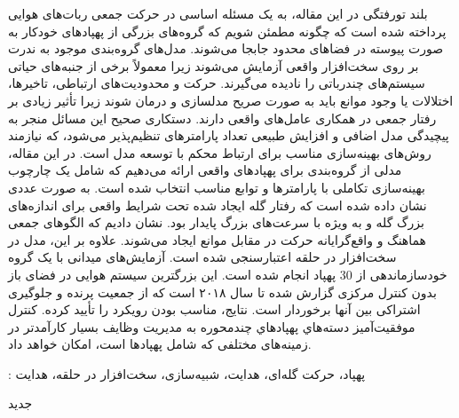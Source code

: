 


\pagestyle{empty}

\begin{وسط‌چین}
\end{وسط‌چین}


‌بلند
‌تورفتگی 
در این مقاله، به یک مسئله اساسی در حرکت جمعی ربات‌های هوایی پرداخته شده است که چگونه مطمئن شویم که گروه‌های بزرگی از پهپادهای خودکار به صورت پیوسته در فضاهای محدود جابجا می‌شوند. مدل‌های گروه‌بندی موجود به ندرت بر روی سخت‌افزار واقعی آزمایش می‌شوند زیرا معمولاً برخی از جنبه‌های حیاتی سیستم‌های چندرباتی را نادیده می‌گیرند. حرکت و محدودیت‌های ارتباطی، تاخیرها، اختلالات یا وجود موانع باید به صورت صریح مدلسازی و درمان شوند زیرا تأثیر زیادی بر رفتار جمعی در همکاری عامل‌های واقعی دارند. دستکاری صحیح این مسائل منجر به پیچیدگی مدل اضافی و افزایش طبیعی تعداد پارامترهای تنظیم‌پذیر می‌شود، که نیازمند روش‌های بهینه‌سازی مناسب برای ارتباط محکم با توسعه مدل است. در این مقاله، مدلی از گروه‌بندی برای پهپادهای واقعی ارائه می‌دهیم که شامل یک چارچوب بهینه‌سازی تکاملی با پارامترها و توابع مناسب انتخاب شده است. به صورت عددی نشان داده شده است که رفتار گله ایجاد شده تحت شرایط واقعی برای اندازه‌های بزرگ گله و به ویژه با سرعت‌های بزرگ پایدار بود. نشان دادیم که الگوهای جمعی هماهنگ و واقع‌گرایانه حرکت در مقابل موانع ایجاد می‌شوند. علاوه بر این، مدل  در سخت‌افزار در حلقه اعتبارسنجی شده است.  آزمایش‌های میدانی با یک گروه خودسازماندهی از 30 پهپاد انجام شده است. این بزرگترین سیستم هوایی در فضای باز بدون کنترل مرکزی گزارش شده تا سال ۲۰۱۸ است که از جمعیت پرنده و جلوگیری اشتراکی بین آنها برخوردار است. نتایج، مناسب بودن رویکرد را تأیید کرده. کنترل موفقیت‌آمیز دسته‌هاي پهپادهاي چندمحوره به مدیریت وظایف بسیار کارآمدتر در زمینه‌های مختلفی که شامل پهپادها است، امکان خواهد داد.

 : 
پهپاد، حرکت گله‌ای، هدایت، شبیه‌سازی، سخت‌افزار در حلقه، هدایت

‌جدید
